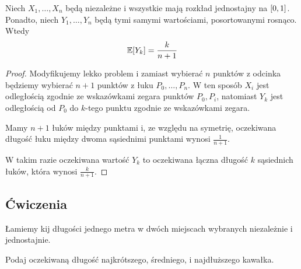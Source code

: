 \begin{theorem}
    Niech \( X_1, \dots, X_n \) będą niezależne i wszystkie mają rozkład jednostajny na \( \left[0, 1\right] \).
    Ponadto, niech \( Y_1, \dots, Y_n \) będą tymi samymi wartościami, posortowanymi rosnąco. Wtedy
    \[
        \expected{Y_k} = \frac{k}{n + 1}
    \]
\end{theorem}
\begin{proof}
    Modyfikujemy lekko problem i zamiast wybierać \( n \) punktów z odcinka będziemy wybierać \( n + 1 \) punktów z łuku \(P_0, \dots, P_n\).
    W ten sposób \( X_i \) jest odległością zgodnie ze wskazówkami zegara punktów \( P_0, P_i \), 
    natomiast \( Y_k \) jest odległością od \( P_0 \) do \(k\)-tego punktu zgodnie ze wskazówkami zegara.
    
    Mamy \( n + 1 \) łuków między punktami i, ze względu na symetrię, oczekiwana długość łuku między dwoma sąsiednimi punktami wynosi \( \frac{1}{n + 1} \).
    
    W takim razie oczekiwana wartość \( Y_k \) to oczekiwana łączna długość \( k \) sąsiednich łuków, która wynosi \( \frac{k}{n + 1} \).
\end{proof}

\newpage
\subsection{Ćwiczenia}
\begin{exercise}
    \label{breaking-sticks-in-three-parts}
    Łamiemy kij długości jednego metra w dwóch miejscach wybranych niezależnie i jednostajnie.
    
    Podaj oczekiwaną długość najkrótszego, średniego, i najdłuższego kawałka.
\end{exercise}

